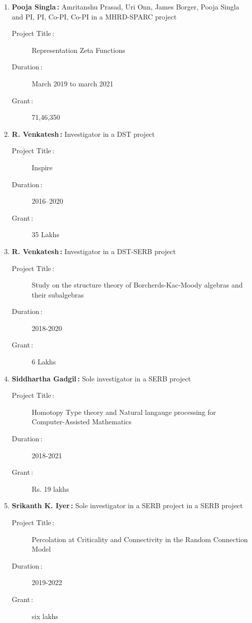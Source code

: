 \begin{enumerate}
\item {\bf Pooja Singla\,:} Amritanshu Prasad, Uri Onn, James Borger, Pooja Singla and PI, PI, Co-PI, Co-PI  in a MHRD-SPARC  project
\begin{description}
  \item[Project Title\,:] Representation Zeta Functions
  \item[Duration\,:] March 2019 to march 2021
  \item[Grant\,:] 71,46,350
\end{description}


\item {\bf R. Venkatesh\,:} Investigator in a DST project
\begin{description}
  \item[Project Title\,:] Inspire
  \item[Duration\,:] 2016--2020
  \item[Grant\,:] 35 Lakhs
\end{description}


\item {\bf R. Venkatesh\,:} Investigator in a DST-SERB project
\begin{description}
  \item[Project Title\,:] Study on the structure theory of Borcherds-Kac-Moody algebras and their subalgebras
  \item[Duration\,:] 2018-2020
  \item[Grant\,:] 6 Lakhs
\end{description}


\item {\bf Siddhartha Gadgil\,:} Sole investigator in a SERB project
\begin{description}
  \item[Project Title\,:] Homotopy Type theory and Natural langauge processing for Computer-Assisted Mathematics
  \item[Duration\,:] 2018-2021
  \item[Grant\,:] Rs. 19 lakhs
\end{description}


\item {\bf Srikanth K. Iyer\,:} Sole investigator in a SERB project in a SERB project
\begin{description}
  \item[Project Title\,:] Percolation at Criticality and Connectivity in the Random Connection Model
  \item[Duration\,:] 2019-2022
  \item[Grant\,:] six lakhs
\end{description}



\end{enumerate}

